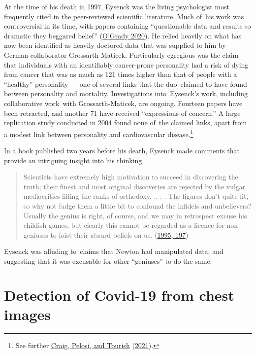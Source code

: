 \documentclass[
  10pt,
  b5paper]{book}
\begin{document}
At the time of his death in 1997, Eysenck was the living psychologist
most frequently cited in the peer-reviewed scientific literature.
Much of~his work was controversial in its time, with papers
containing ``questionable data and results so dramatic they beggared
belief'' (\protect\hyperlink{ref-o2020famous}{O'Grady 2020}). He relied heavily on what has now been
identified as heavily doctored data that was supplied to him by
German collaborator Grossarth-Maticek. Particularly egregious was
the claim that individuals with an identifiably cancer-prone personality
had a risk of dying from cancer that was as much as 121 times higher
than that of people with a ``healthy'' personality --- one of several
links that the duo~claimed to have found between personality and
mortality. Investigations into~Eysenck's work, including
collaborative work~with Grossarth-Maticek, are ongoing. Fourteen
papers have been retracted, and another 71 have received
``expressions of concern.'' A large replication study conducted in
2004 found none of~the claimed links, apart from a modest link between
personality and cardiovascular disease.\footnote{See further \protect\hyperlink{ref-CraigEtAl}{Craig, Pelosi, and Tourish} (\protect\hyperlink{ref-CraigEtAl}{2021}).}

In a book published two years before his death, Eysenck made
comments that provide an intriguing insight into his thinking.

\begin{quote}
Scientists have extremely high motivation to succeed in discovering the truth; their finest and most original discoveries are rejected by the vulgar mediocrities filling the ranks of orthodoxy. .. . . The figures don't quite fit, so why not fudge them a little bit to confound the infidels and unbelievers? Usually the genius is right, of course, and we may in retrospect excuse his childish games, but clearly this cannot be regarded as a licence for non-geniuses to foist their absurd beliefs on us. (\protect\hyperlink{ref-eysenck1995genius}{1995, 197})
\end{quote}

Eysenck was alluding to~claims that Newton had manipulated data, and
suggesting that it was excusable for other ``geniuses'' to do the same.

\hypertarget{detection-of-covid-19-from-chest-images}{%
\section{Detection of Covid-19 from chest images}\label{detection-of-covid-19-from-chest-images}}
\end{document}
